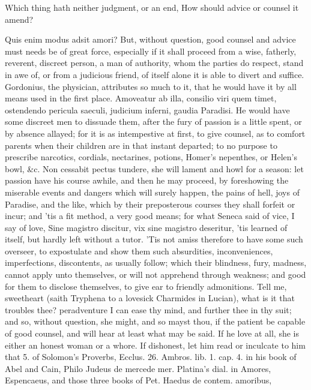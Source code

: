 {Which thing hath neither judgment, or an end,
How should advice or counsel it amend?

Quis enim modus adsit amori? But, without question, good counsel
and advice must needs be of great force, especially if it shall proceed
from a wise, fatherly, reverent, discreet person, a man of authority,
whom the parties do respect, stand in awe of, or from a judicious
friend, of itself alone it is able to divert and suffice. Gordonius,
the physician, attributes so much to it, that he would have it by all
means used in the first place. Amoveatur ab illa, consilio viri quem
timet, ostendendo pericula saeculi, judicium inferni, gaudia Paradisi.
He would have some discreet men to dissuade them, after the fury of
passion is a little spent, or by absence allayed; for it is as
intempestive at first, to give counsel, as to comfort parents when
their children are in that instant departed; to no purpose to prescribe
narcotics, cordials, nectarines, potions, Homer's nepenthes, or Helen's
bowl, \&c. Non cessabit pectus tundere, she will lament and howl for a
season: let passion have his course awhile, and then he may proceed, by
foreshowing the miserable events and dangers which will surely happen,
the pains of hell, joys of Paradise, and the like, which by their
preposterous courses they shall forfeit or incur; and 'tis a fit
method, a very good means; for what Seneca said of vice, I say of
love, Sine magistro discitur, vix sine magistro deseritur, 'tis learned
of itself, but hardly left without a tutor. 'Tis not amiss
therefore to have some such overseer, to expostulate and show them such
absurdities, inconveniences, imperfections, discontents, as usually
follow; which their blindness, fury, madness, cannot apply unto
themselves, or will not apprehend through weakness; and good for them
to disclose themselves, to give ear to friendly admonitions. Tell me,
sweetheart (saith Tryphena to a lovesick Charmides in Lucian),
what is it that troubles thee? peradventure I can ease thy mind, and
further thee in thy suit; and so, without question, she might, and so
mayst thou, if the patient be capable of good counsel, and will hear at
least what may be said.
If he love at all, she is either an honest woman or a whore. If
dishonest, let him read or inculcate to him that 5. of Solomon's
Proverbs, Ecclus. 26. Ambros. lib. 1. cap. 4. in his book of Abel and
Cain, Philo Judeus de mercede mer. Platina's dial. in Amores,
Espencaeus, and those three books of Pet. Haedus de contem. amoribus,
}
